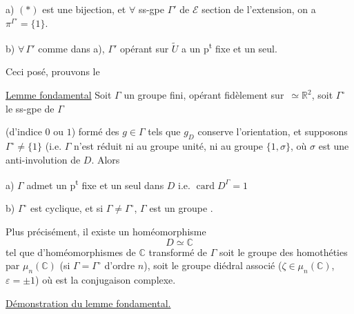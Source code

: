 
 a) $(*)$ est une bijection, et $\forall$ ss-gpe $\Gamma'$ de $\mathcal E$ section de l'extension,  on a $\pi^{\Gamma'}=\{1\}$.

 b) $\forall\,\Gamma'$ comme dans a), $\Gamma'$ opérant sur $\widetilde U$ a un p\textsuperscript{t} fixe et un seul.

Ceci posé, prouvons le

\uline{Lemme fondamental} Soit $\Gamma$ un groupe  fini, opérant fidèlement sur  \,$\simeq\mathbb R^2$, soit  $\Gamma^\circ$ le ss-gpe de $\Gamma$


(d'indice $0$ ou $1$) formé des $g\in\Gamma$ tels que $g_D$ conserve l'orientation, et supposons $\Gamma^\circ\ne\{1\}$ (i.e. $\Gamma$ n'est réduit ni au groupe unité, ni au groupe  $\{1,\sigma\}$, où $\sigma$ est une anti-involution de $D$. Alors

 a) $\Gamma$ admet un p\textsuperscript{t} fixe et un seul dans $D$ i.e. $\operatorname{card}D^\Gamma=1$

 b)  $\Gamma^\circ$ est cyclique, et si $\Gamma\ne\Gamma^\circ$, $\Gamma$ est un groupe .

Plus précisément, il existe un homéomorphisme
\[
D\simeq\mathbb C
\]
tel que    d'homéomorphismes de $\mathbb C$ transformé de   $\Gamma$ soit le groupe des homothéties par $\mu_n(\mathbb C)$ (si $\Gamma=\Gamma^\circ$ d'ordre $n$), soit le groupe diédral associé  ($\zeta\in\mu_n(\mathbb C)$, $\varepsilon=\pm1$) où \unsure{$\sigma$}  est la conjugaison complexe.

\uline{Démonstration du lemme fondamental.}


